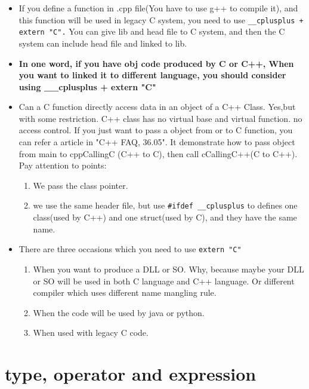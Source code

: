 \documentclass[a4paper,11pt,twoside]{book}
\begin{document}
\begin{itemize}
	\item If you define a function in .cpp file(You have to use g++ to compile it), and this function will be used in legacy C system, you need to use \texttt{\_\_cplusplus + extern "C".}  You can give lib and head file to C system,  and then the C system can include head file and linked to lib.
	
	\item \textbf{In one word, if you have obj code produced by C or C++, When you want to linked it to different language, you should consider using \_\_cplusplus + extern "C" }
	
	\item Can a C function directly access data in an object of a C++ Class. Yes,but with some restriction. C++ class has no virtual base and virtual function. no access control. If you just want to pass a object from or to C function, you can refer a article in "C++ FAQ, 36.05". It demonstrate how to pass object from main to cppCallingC (C++ to C), then call cCallingC++(C to C++). Pay attention to points:
	\begin{enumerate}
		\item We pass the class pointer.
		\item we use the same header file, but use \texttt{\#ifdef \_\_cplusplus} to defines one class(used by C++) and one struct(used by C), and they have the same name.
	\end{enumerate}
	
	\item There are three occasions which you need to use \texttt{extern "C"}
	\begin{enumerate}
		\item When you want to produce a DLL or SO. Why, because maybe your DLL or SO will be used in both C language and C++ language. Or different compiler which uses different name mangling rule.
		
		\item When the code will be used by java or python.
		
		\item When used with legacy C code.
	\end{enumerate}
\end{itemize}









\chapter{type, operator and expression}
\end{document}
